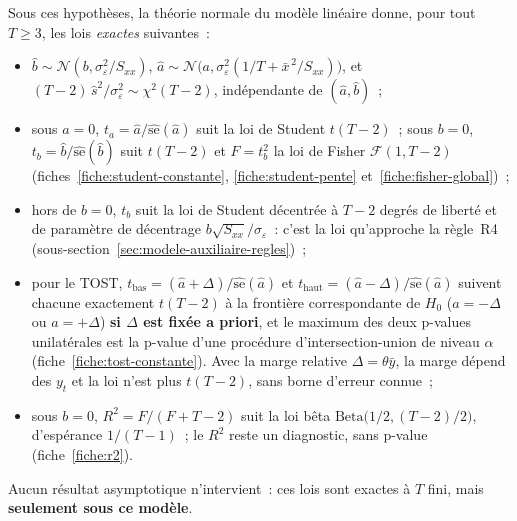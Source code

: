 \documentclass[a4paper,11pt]{article}
\begin{document}
Sous ces hypothèses, la théorie normale du modèle linéaire donne, pour tout $T \ge 3$, les lois
\emph{exactes} suivantes~:
\begin{itemize}[itemsep=1pt]
  \item $\hat b \sim \mathcal{N}(b, \sigma_\varepsilon^2/S_{xx})$,
  $\hat a \sim \mathcal{N}\big(a, \sigma_\varepsilon^2(1/T + \bar x^{\,2}/S_{xx})\big)$, et
  $(T-2)\,\hat s^2/\sigma_\varepsilon^2 \sim \chi^2(T-2)$, indépendante de $(\hat a, \hat b)$~;
  \item sous $a = 0$, $t_a = \hat a/\widehat{\mathrm{se}}(\hat a)$ suit la loi de Student
  $t(T-2)$~; sous $b = 0$, $t_b = \hat b/\widehat{\mathrm{se}}(\hat b)$ suit $t(T-2)$ et
  $F = t_b^2$ la loi de Fisher $\mathcal{F}(1, T-2)$ (fiches~\ref{fiche:student-constante},
  \ref{fiche:student-pente} et~\ref{fiche:fisher-global})~;
  \item hors de $b = 0$, $t_b$ suit la loi de Student décentrée à $T-2$ degrés de liberté et de
  paramètre de décentrage $b\sqrt{S_{xx}}/\sigma_\varepsilon$~: c'est la loi qu'approche la
  règle~R4 (sous-section~\ref{sec:modele-auxiliaire-regles})~;
  \item pour le TOST, $t_{\text{bas}} = (\hat a + \Delta)/\widehat{\mathrm{se}}(\hat a)$ et
  $t_{\text{haut}} = (\hat a - \Delta)/\widehat{\mathrm{se}}(\hat a)$ suivent chacune exactement
  $t(T-2)$ à la frontière correspondante de $H_0$ ($a = -\Delta$ ou $a = +\Delta$) \textbf{si
  $\Delta$ est fixée a priori}, et le maximum des deux p-values unilatérales est la p-value d'une
  procédure d'intersection-union de niveau $\alpha$ (fiche~\ref{fiche:tost-constante}). Avec la
  marge relative $\Delta = \theta\bar y$, la marge dépend des $y_t$ et la loi n'est plus
  $t(T-2)$, sans borne d'erreur connue~;
  \item sous $b = 0$, $R^2 = F/(F + T - 2)$ suit la loi bêta $\mathrm{Beta}\big(1/2, (T-2)/2\big)$,
  d'espérance $1/(T-1)$~; le $R^2$ reste un diagnostic, sans p-value (fiche~\ref{fiche:r2}).
\end{itemize}
Aucun résultat asymptotique n'intervient~: ces lois sont exactes à $T$ fini, mais
\textbf{seulement sous ce modèle}.
\end{document}
